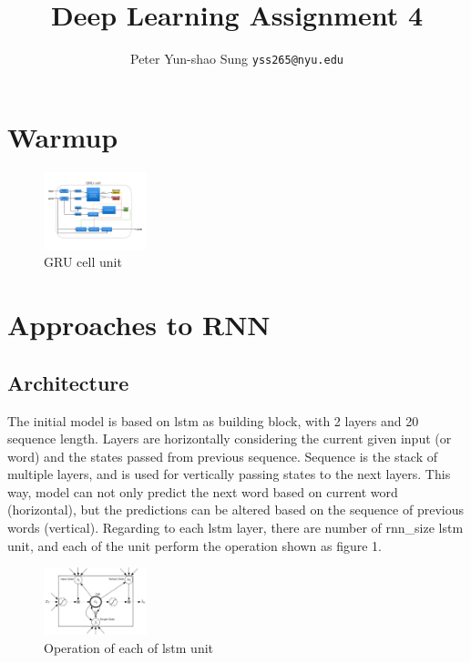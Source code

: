 \documentclass{article}
\title{Deep Learning Assignment 4}
\author{
  Peter Yun-shao Sung
  \texttt{yss265@nyu.edu} \\
}
\begin{document}

\maketitle
\section{Warmup}
\begin{figure}[h]
\centering
\includegraphics[width=30mm]{../q2/q2.png}
  \caption{GRU cell unit}
\end{figure}

\section{Approaches to RNN}
\subsection{Architecture}
The initial model is based on lstm as building block, with 2 layers and 20 sequence length. Layers are horizontally considering the current given input (or word) and the states passed from previous sequence. Sequence is the stack of multiple layers, and is used for vertically passing states to the next layers. This way, model can not only predict the next word based on current word (horizontal), but the predictions can be altered based on the sequence of previous words (vertical). Regarding to each lstm layer, there are number of rnn\_size lstm unit, and each of the unit perform the operation shown as figure 1.

\begin{figure}[h]
\centering
\includegraphics[width=30mm]{./fig/lstm.png}
  \caption{Operation of each of lstm unit}
\end{figure}
\end{document}
